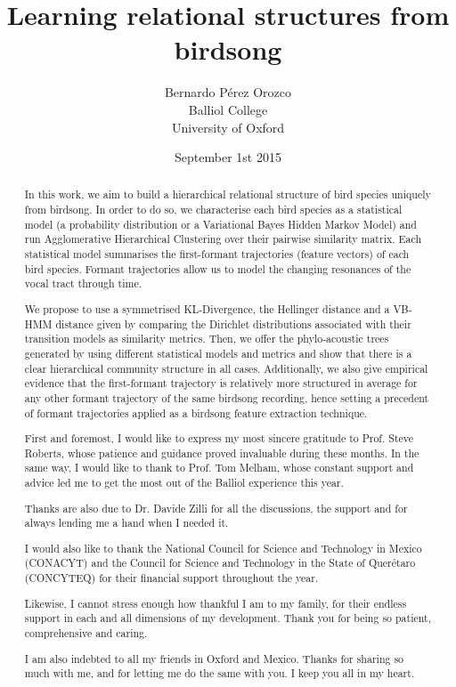 \documentclass[pdftex,12pt,a4paper]{report}
\title{Learning relational structures from birdsong}
\author{Bernardo Pérez Orozco\\Balliol College\\University of Oxford}
\date{ September 1st 2015 }
\theoremstyle{definition}
\theoremstyle{remark}
\begin{document}
 

\begin{abstract}
In this work, we aim to build a hierarchical relational structure of bird species uniquely from birdsong. In order to do so, we characterise each bird species as a statistical model (a probability distribution or a Variational Bayes Hidden Markov Model) and run Agglomerative Hierarchical Clustering over their pairwise similarity matrix. Each statistical model summarises the first-formant trajectories (feature vectors) of each bird species. Formant trajectories allow us to model the changing resonances of the vocal tract through time.
\par We propose to use a symmetrised KL-Divergence, the Hellinger distance and a VB-HMM distance given by comparing the Dirichlet distributions associated with their transition models as similarity metrics. Then, we offer the phylo-acoustic trees generated by using different statistical models and metrics and show that there is a clear hierarchical community structure in all cases. Additionally, we also give empirical evidence that the first-formant trajectory is relatively more structured in average for any other formant trajectory of the same birdsong recording, hence setting a precedent of formant trajectories applied as a birdsong feature extraction technique.
\end{abstract}

\renewcommand{\abstractname}{Acknowledgements}
\begin{abstract}
First and foremost, I would like to express my most sincere gratitude to Prof. Steve Roberts, whose patience and guidance proved invaluable during these months. In the same way, I would like to thank to Prof. Tom Melham, whose constant support and advice led me to get the most out of the Balliol experience this year.
\par Thanks are also due to Dr. Davide Zilli for all the discussions, the support and for always lending me a hand when I needed it. 
\par I would also like to thank the National Council for Science and Technology in Mexico (CONACYT) and the Council for Science and Technology in the State of Querétaro (CONCYTEQ) for their financial support throughout the year.
\par Likewise, I cannot stress enough how thankful I am to my family, for their endless support in each and all dimensions of my development. Thank you for being so patient, comprehensive and caring. 
\par I am also indebted to all my friends in Oxford and Mexico. Thanks for sharing so much with me, and for letting me do the same with you. I keep you all in my heart.
\end{abstract}
\end{document}
